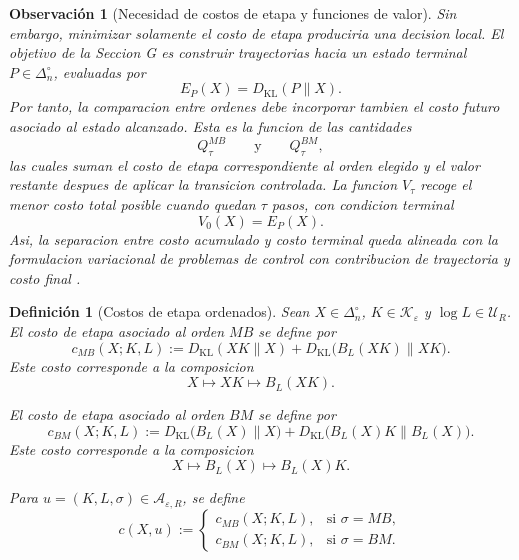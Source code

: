 ﻿\documentclass[12pt]{article}
\newtheorem{definicion}{Definición}[section]
\newtheorem{observacion}{Observación}[section]
\begin{document}
\begin{observacion}[Necesidad de costos de etapa y funciones de valor]
Sin embargo, minimizar solamente el costo de etapa produciria una decision local. El objetivo de la Seccion G es construir trayectorias hacia un estado terminal \(P\in\Delta_n^\circ\), evaluadas por
\[
E_P(X)=D_{\mathrm{KL}}(P\|X).
\]
Por tanto, la comparacion entre ordenes debe incorporar tambien el costo futuro asociado al estado alcanzado. Esta es la funcion de las cantidades
\[
Q_\tau^{MB}
\qquad\text{y}\qquad
Q_\tau^{BM},
\]
las cuales suman el costo de etapa correspondiente al orden elegido y el valor restante despues de aplicar la transicion controlada. La funcion \(V_\tau\) recoge el menor costo total posible cuando quedan \(\tau\) pasos, con condicion terminal
\[
V_0(X)=E_P(X).
\]
Asi, la separacion entre costo acumulado y costo terminal queda alineada con la formulacion variacional de problemas de control con contribucion de trayectoria y costo final \citep{Kappen2005LinearTheoryForControlOfNonLinearStochasticSystems}.
\end{observacion}

\begin{definicion}[Costos de etapa ordenados]\label{def:costos_etapa_ordenados}
Sean \(X\in\Delta_n^\circ\), \(K\in\mathcal K_\varepsilon\) y \(\log L\in\mathcal U_R\). El costo de etapa asociado al orden \(MB\) se define por
\[
c_{MB}(X;K,L)
:=
D_{\mathrm{KL}}(XK\|X)
+
D_{\mathrm{KL}}\bigl(B_L(XK)\|XK\bigr).
\]
Este costo corresponde a la composicion
\[
X
\longmapsto
XK
\longmapsto
B_L(XK).
\]

El costo de etapa asociado al orden \(BM\) se define por
\[
c_{BM}(X;K,L)
:=
D_{\mathrm{KL}}\bigl(B_L(X)\|X\bigr)
+
D_{\mathrm{KL}}\bigl(B_L(X)K\|B_L(X)\bigr).
\]
Este costo corresponde a la composicion
\[
X
\longmapsto
B_L(X)
\longmapsto
B_L(X)K.
\]

Para \(u=(K,L,\sigma)\in\mathcal A_{\varepsilon,R}\), se define
\[
c(X,u)
:=
\begin{cases}
c_{MB}(X;K,L), & \text{si } \sigma=MB,\\[2mm]
c_{BM}(X;K,L), & \text{si } \sigma=BM.
\end{cases}
\]
\end{definicion}
\end{document}
